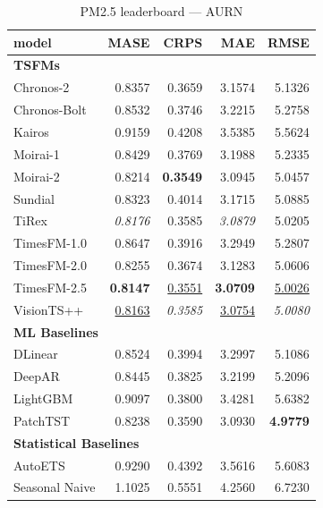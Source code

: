 \begin{table}[H]
\caption{PM2.5 leaderboard --- AURN}
\centering
\begin{small}
\begin{tabular}{lrrrr}
\toprule
model & MASE & CRPS & MAE & RMSE \\
\midrule
\multicolumn{5}{l}{\textbf{TSFMs}} \\
Chronos-2 & 0.8357 & 0.3659 & 3.1574 & 5.1326 \\
Chronos-Bolt & 0.8532 & 0.3746 & 3.2215 & 5.2758 \\
Kairos & 0.9159 & 0.4208 & 3.5385 & 5.5624 \\
Moirai-1 & 0.8429 & 0.3769 & 3.1988 & 5.2335 \\
Moirai-2 & 0.8214 & \textbf{0.3549} & 3.0945 & 5.0457 \\
Sundial & 0.8323 & 0.4014 & 3.1715 & 5.0885 \\
TiRex & \textit{0.8176} & 0.3585 & \textit{3.0879} & 5.0205 \\
TimesFM-1.0 & 0.8647 & 0.3916 & 3.2949 & 5.2807 \\
TimesFM-2.0 & 0.8255 & 0.3674 & 3.1283 & 5.0606 \\
TimesFM-2.5 & \textbf{0.8147} & \underline{0.3551} & \textbf{3.0709} & \underline{5.0026} \\
VisionTS++ & \underline{0.8163} & \textit{0.3585} & \underline{3.0754} & \textit{5.0080} \\
\midrule
\multicolumn{5}{l}{\textbf{ML Baselines}} \\
DLinear & 0.8524 & 0.3994 & 3.2997 & 5.1086 \\
DeepAR & 0.8445 & 0.3825 & 3.2199 & 5.2096 \\
LightGBM & 0.9097 & 0.3800 & 3.4281 & 5.6382 \\
PatchTST & 0.8238 & 0.3590 & 3.0930 & \textbf{4.9779} \\
\midrule
\multicolumn{5}{l}{\textbf{Statistical Baselines}} \\
AutoETS & 0.9290 & 0.4392 & 3.5616 & 5.6083 \\
Seasonal Naive & 1.1025 & 0.5551 & 4.2560 & 6.7230 \\
\bottomrule
\end{tabular}
\end{small}
\end{table}